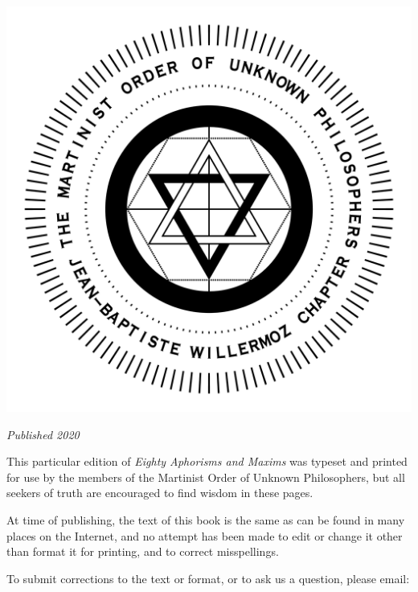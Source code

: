 \blankpage

\vspace*{\fill}

\begin{center}
	\includegraphics[width=\textwidth]{jbw_seal_2000px.png}\\\bigskip
	
	\textit{Published 2020}
\end{center}

\vspace*{\fill}

\blankpage

\vspace*{\fill}
	
This particular edition of \textit{Eighty Aphorisms and Maxims} was typeset and printed for use by the members of the Martinist Order of Unknown Philosophers, but all seekers of truth are encouraged to find wisdom in these pages.

At time of publishing, the text of this book is the same as can be found in many places on the Internet, and no attempt has been made to edit or change it other than format it for printing, and to correct misspellings.

To submit corrections to the text or format, or to ask us a question, please email: 


